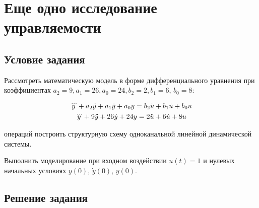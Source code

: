 \newpage
\label{ch:chap2}
\section{Еще одно исследование управляемости} 
\subsection{Условие задания}

Рассмотреть математическую модель в форме дифференциального уравнения при коэффициентах 
$a_2 = 9, a_1 = 26, a_0 = 24, b_2 = 2, b_1 = 6$, $b _0 = 8$:

\begin{gather}
	\notag
	\dddot{y} + a_2\ddot{y} + a_1\dot{y} + a_0y = b_2\ddot{u} + b_1\dot{u} + b_0u\\
	\dddot{y} + 9\ddot{y} + 26\dot{y} + 24y = 2\ddot{u} + 6\dot{u} + 8u
\end{gather}

операций построить структурную схему одноканальной линейной динамической системы.

Выполнить моделирование при входном воздействии $u(t) = 1$ и нулевых начальных условиях 
$\ddot{y}(0)$, $\dot{y}(0)$, $y(0)$.

\subsection{Решение задания}


\endinput